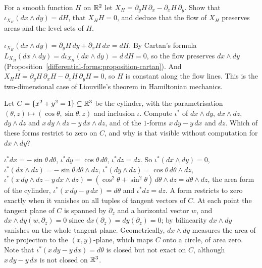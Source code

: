 \begin{exercise}\label{differential-forms:exercise-hamiltonian-area}
For a smooth function $H$ on $\mathbb{R}^2$ let $X_H = \partial_yH\,\partial_x - \partial_xH\,\partial_y$. Show that $\iota_{X_H}(dx \wedge dy) = dH$, that $X_HH = 0$, and deduce that the flow of $X_H$
preserves areas and the level sets of $H$.
\end{exercise}

\begin{solution}
$\iota_{X_H}(dx \wedge dy) = \partial_yH\,dy + \partial_xH\,dx = dH$. By Cartan's formula $L_{X_H}(dx \wedge dy) = d\iota_{X_H}(dx \wedge dy) = d\,dH = 0$, so the flow preserves $dx \wedge dy$
(Proposition~\ref{differential-forms:proposition-cartan}). And $X_HH = \partial_yH\,\partial_xH - \partial_xH\,\partial_yH = 0$, so $H$ is constant along the flow lines. This is the
two-dimensional case of Liouville's theorem in Hamiltonian mechanics.
\end{solution}

\begin{exercise}\label{differential-forms:exercise-forms-on-submanifolds}
Let $C = \{x^2 + y^2 = 1\} \subseteq \mathbb{R}^3$ be the cylinder, with the parametrisation $(\theta, z) \mapsto (\cos\theta, \sin\theta, z)$ and inclusion $\iota$. Compute $\iota^*$ of $dx \wedge dy$, $dx \wedge dz$,
$dy \wedge dz$ and $x\,dy \wedge dz - y\,dx \wedge dz$, and of the $1$-forms $x\,dy - y\,dx$ and $dz$. Which of these forms restrict to zero on $C$, and why is that visible without computation for
$dx \wedge dy$?
\end{exercise}

\begin{solution}
$\iota^*dx = -\sin\theta\,d\theta$, $\iota^*dy = \cos\theta\,d\theta$, $\iota^*dz = dz$. So $\iota^*(dx \wedge dy) = 0$, $\iota^*(dx \wedge dz) = -\sin\theta\,d\theta \wedge dz$,
$\iota^*(dy \wedge dz) = \cos\theta\,d\theta \wedge dz$, $\iota^*(x\,dy \wedge dz - y\,dx \wedge dz) = (\cos^2\theta + \sin^2\theta)\,d\theta \wedge dz = d\theta \wedge dz$, the area form of the cylinder,
$\iota^*(x\,dy - y\,dx) = d\theta$ and $\iota^*dz = dz$. A form restricts to zero exactly when it vanishes on all tuples of tangent vectors of $C$. At each point the tangent plane of $C$ is spanned by $\partial_z$ and a
horizontal vector $w$, and $dx \wedge dy(w, \partial_z) = 0$ since $dx(\partial_z) = dy(\partial_z) = 0$; by bilinearity $dx \wedge dy$ vanishes on the whole tangent plane. Geometrically, $dx \wedge dy$ measures
the area of the projection to the $(x, y)$-plane, which maps $C$ onto a circle, of area zero. Note that $\iota^*(x\,dy - y\,dx) = d\theta$ is closed but not exact on $C$, although
$x\,dy - y\,dx$ is not closed on $\mathbb{R}^3$.
\end{solution}


